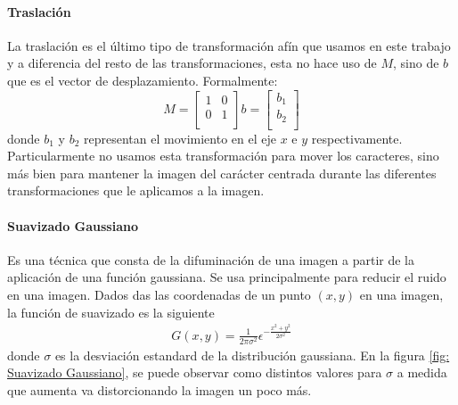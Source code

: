 		\paragraph{Traslación}		
			
			La traslación es el último tipo de transformación afín que usamos en este trabajo y a diferencia del resto de las transformaciones, esta no hace uso de $M$, sino de $b$ que es el vector de desplazamiento. Formalmente:
			\begin{equation*}
				M =  
					\begin{bmatrix}
						1 & 0 \\
						0 & 1  \\
					\end{bmatrix}
					b =
					\begin{bmatrix}
						b_1 \\
						b_2 \\
					\end{bmatrix}	
			\end{equation*}
		donde $b_1$ y $b_2$ representan el movimiento en el eje $x$ e $y$ respectivamente. Particularmente no usamos esta transformación para mover los caracteres, sino más bien para mantener la imagen del carácter centrada durante las diferentes transformaciones que le aplicamos a la imagen.
		
		
		\paragraph{Suavizado Gaussiano}
		
			Es una técnica que consta de la difuminación de una imagen a partir de la aplicación de una función gaussiana. Se usa principalmente para reducir el ruido en una imagen. Dados das las coordenadas de un punto $(x, y)$ en una imagen, la función de suavizado es la siguiente
			\begin{align*}
				G(x,y) = \frac{1}{2\pi\sigma^2}\epsilon^{-\frac{x^2+y^2}{2\sigma^2}}
			\end{align*}
			donde $\sigma$ es la desviación estandard de la distribución gaussiana. En la figura \ref{fig: Suavizado Gaussiano}, se puede observar como distintos valores para $\sigma$ a medida que aumenta va distorcionando la imagen un poco más.
			
